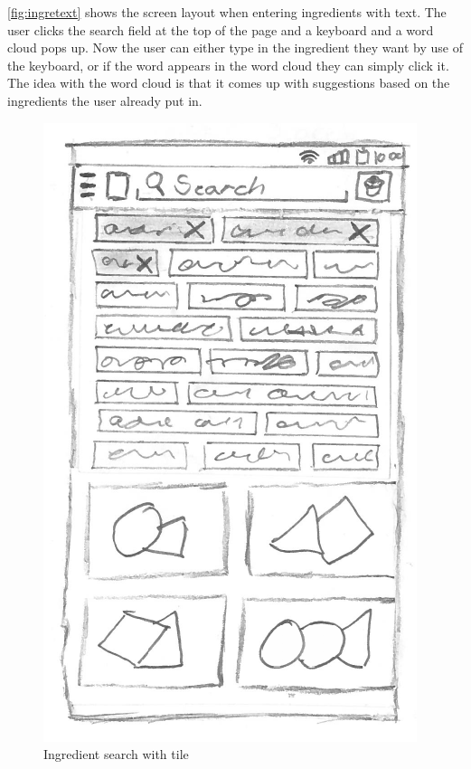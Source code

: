 \autoref{fig:ingretext} shows the screen layout when entering ingredients with text. The user clicks the search field at the top of the page and a keyboard and a word cloud pops up. Now the user can either type in the ingredient they want by use of the keyboard, or if the word appears in the word cloud they can simply click it. The idea with the word cloud is that it comes up with suggestions based on the ingredients the user already put in.

\begin{figure}[H]
\begin{minipage}[b]{0.5\columnwidth}
\centering
\includegraphics[width=0.7\columnwidth]{img/prototypes/ingredient_search_tile.pdf}
\caption{Ingredient search with tile\label{fig:ingreani}}
\end{minipage}
\hspace{0.5cm}
\begin{minipage}[b]{0.5\columnwidth}
\centering

\end{minipage}
\end{figure}
